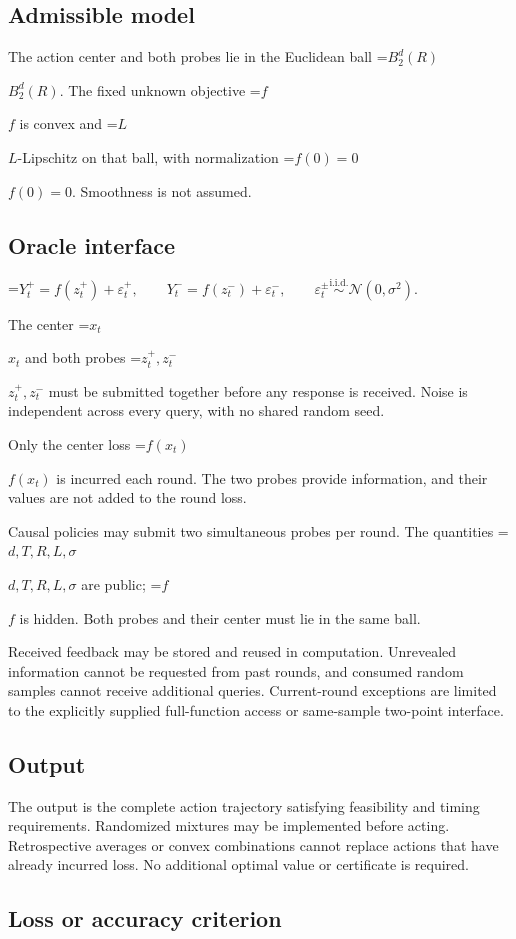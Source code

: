 \documentclass[10pt,a4paper]{article}
\newcommand{\AtlasMath}[1]{\par\begingroup\centering\setbox0=\hbox{$\displaystyle #1$}\ifdim\wd0>1.4\linewidth\typeout{ATLAS WIDE FORMULA: \the\wd0}\fi\ifdim\wd0>\linewidth\resizebox{\linewidth}{!}{\box0}\else\box0\fi\par\endgroup}
\newcommand{\AtlasInlineMath}[1]{\begingroup\setbox0=\hbox{$#1$}\ifdim\wd0>.4\linewidth\endgroup\AtlasMath{#1}\else\endgroup$#1$\fi}
\begin{document}
\subsection{Admissible model}
The action center and both probes lie in the Euclidean ball \AtlasInlineMath{B_2^d(R)}. The fixed unknown objective \AtlasInlineMath{f} is convex and \AtlasInlineMath{L}-Lipschitz on that ball, with normalization \AtlasInlineMath{f(0)=0}. Smoothness is not assumed.

\subsection{Oracle interface}

\AtlasMath{Y_t^+=f(z_t^+)+\varepsilon_t^+,\qquad Y_t^-=f(z_t^-)+\varepsilon_t^-,\qquad \varepsilon_t^\pm\overset{\mathrm{i.i.d.}}\sim\mathcal{N}(0,\sigma^2).}


The center \AtlasInlineMath{x_t} and both probes \AtlasInlineMath{z_t^+,z_t^-} must be submitted together before any response is received. Noise is independent across every query, with no shared random seed.

Only the center loss \AtlasInlineMath{f(x_t)} is incurred each round. The two probes provide information, and their values are not added to the round loss.

Causal policies may submit two simultaneous probes per round. The quantities \AtlasInlineMath{d,T,R,L,\sigma} are public; \AtlasInlineMath{f} is hidden. Both probes and their center must lie in the same ball.

Received feedback may be stored and reused in computation. Unrevealed information cannot be requested from past rounds, and consumed random samples cannot receive additional queries. Current-round exceptions are limited to the explicitly supplied full-function access or same-sample two-point interface.

\subsection{Output}
The output is the complete action trajectory satisfying feasibility and timing requirements. Randomized mixtures may be implemented before acting. Retrospective averages or convex combinations cannot replace actions that have already incurred loss. No additional optimal value or certificate is required.

\subsection{Loss or accuracy criterion}
\end{document}
